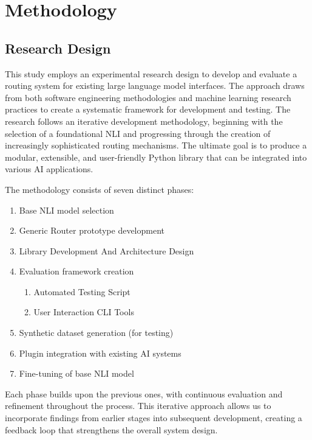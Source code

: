 \chapter{Methodology}
\label{ch:method} %

\section{Research Design}

This study employs an experimental research design to develop and evaluate a routing system for existing large language model interfaces. The approach draws from both software engineering methodologies and machine learning research practices to create a systematic framework for development and testing. The research follows an iterative development methodology, beginning with the selection of a foundational NLI and progressing through the creation of increasingly sophisticated routing mechanisms. The ultimate goal is to produce a modular, extensible, and user-friendly Python library that can be integrated into various AI applications.

The methodology consists of seven distinct phases:

\begin{enumerate}
    \item Base NLI model selection
    \item Generic Router prototype development
    \item Library Development And Architecture Design
    \item Evaluation framework creation
    \begin{enumerate}
        \item Automated Testing Script
        \item User Interaction CLI Tools
    \end{enumerate}
    \item Synthetic dataset generation (for testing)
    \item Plugin integration with existing AI systems
    \item Fine-tuning of base NLI model
\end{enumerate}

Each phase builds upon the previous ones, with continuous evaluation and refinement throughout the process. This iterative approach allows us to incorporate findings from earlier stages into subsequent development, creating a feedback loop that strengthens the overall system design.


